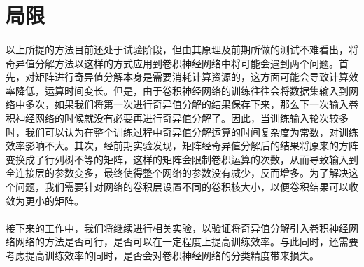 \documentclass[12pt,a4paper]{article}
\begin{document}
\section{局限}
\paragraph{} 以上所提的方法目前还处于试验阶段，但由其原理及前期所做的测试不难看出，将奇异值分解方法以这样的方式应用到卷积神经网络中将可能会遇到两个问题。首先，对矩阵进行奇异值分解本身是需要消耗计算资源的，这方面可能会导致计算效率降低，运算时间变长。但是，由于卷积神经网络的训练往往会将数据集输入到网络中多次，如果我们将第一次进行奇异值分解的结果保存下来，那么下一次输入卷积神经网络的时候就没有必要再进行奇异值分解了。因此，当训练输入轮次较多时，我们可以认为在整个训练过程中奇异值分解运算的时间复杂度为常数，对训练效率影响不大。其次，经前期实验发现，矩阵经奇异值分解后的结果将原来的方阵变换成了行列树不等的矩阵，这样的矩阵会限制卷积运算的次数，从而导致输入到全连接层的参数变多，最终使得整个网络的参数没有减少，反而增多。为了解决这个问题，我们需要针对网络的卷积层设置不同的卷积核大小，以便卷积结果可以收敛为更小的矩阵。
\paragraph{} 接下来的工作中，我们将继续进行相关实验，以验证将奇异值分解引入卷积神经网络网络的方法是否可行，是否可以在一定程度上提高训练效率。与此同时，还需要考虑提高训练效率的同时，是否会对卷积神经网络的分类精度带来损失。







\end{document}

